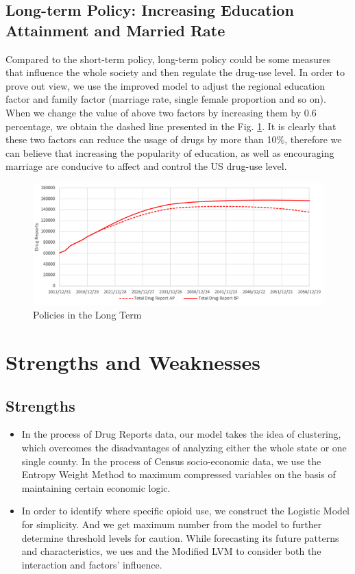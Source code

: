 \documentclass[12pt]{article}
\begin{document}
\subsection{Long-term Policy: Increasing Education Attainment and Married Rate}
Compared to the short-term policy, long-term policy could be some measures that influence the whole society and then regulate the drug-use level. In order to prove out view, we use the improved model to adjust the regional education factor and family factor (marriage rate, single female proportion and so on). When we change the value of above two factors by increasing them by 0.6 percentage, we obtain the dashed line presented in the Fig. \ref{Fig17}. It is clearly that these two factors can reduce the usage of drugs by more than 10\%, therefore we can believe that increasing the popularity of education, as well as encouraging marriage are conducive to affect and control the US drug-use level.
\begin{figure}[H]
	\centering
	\includegraphics[scale=0.7]{./figures/17.png}
	\caption{Policies in the Long Term}
	\label{Fig17}
\end{figure}

\section{Strengths and Weaknesses}
\subsection{Strengths}
\begin{itemize}
	\item In the process of Drug Reports data, our model takes the idea of clustering, which overcomes the disadvantages of analyzing either the whole state or one single county. In the process of Census socio-economic data, we use the Entropy Weight Method to maximum compressed variables on the basis of maintaining certain economic logic.
	\item In order to identify where specific opioid use, we construct the Logistic Model for simplicity. And we get maximum number from the model to further determine threshold levels for caution. While forecasting its future patterns and characteristics, we ues and the Modified LVM to consider both the interaction and factors’ influence.
\end{itemize}
\end{document}
